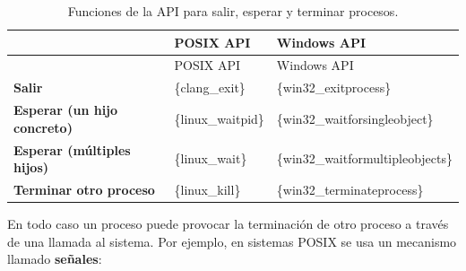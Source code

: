 \begin{longtable}[]{@{}
  >{\raggedright\arraybackslash}p{}
  >{\raggedright\arraybackslash}p{}
  >{\raggedright\arraybackslash}p{}@{}}
\caption{Funciones de la API para salir, esperar y terminar
procesos.}\tabularnewline
\toprule\noalign{}
\begin{minipage}[b]{\linewidth}\raggedright
\end{minipage} & \begin{minipage}[b]{\linewidth}\raggedright
POSIX API
\end{minipage} & \begin{minipage}[b]{\linewidth}\raggedright
Windows API
\end{minipage} \\
\midrule\noalign{}
\endfirsthead
\toprule\noalign{}
\begin{minipage}[b]{\linewidth}\raggedright
\end{minipage} & \begin{minipage}[b]{\linewidth}\raggedright
POSIX API
\end{minipage} & \begin{minipage}[b]{\linewidth}\raggedright
Windows API
\end{minipage} \\
\midrule\noalign{}
\endhead
\bottomrule\noalign{}
\endlastfoot
\textbf{Salir} & \{clang\_exit\} & \{win32\_exitprocess\} \\
\textbf{Esperar (un hijo concreto)} & \{linux\_waitpid\} &
\{win32\_waitforsingleobject\} \\
\textbf{Esperar (múltiples hijos)} & \{linux\_wait\} &
\{win32\_waitformultipleobjects\} \\
\textbf{Terminar otro proceso} & \{linux\_kill\} &
\{win32\_terminateprocess\} \\
\end{longtable}

En todo caso un proceso puede provocar la terminación de otro proceso a
través de una llamada al sistema. Por ejemplo, en sistemas POSIX se usa
un mecanismo llamado \textbf{señales}{}:

\begin{Shaded}
\begin{Highlighting}[]
\OperatorTok{(}\OperatorTok{,}\OperatorTok{);}
\end{Highlighting}
\end{Shaded}

